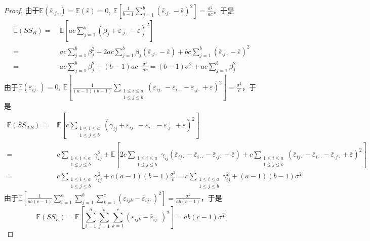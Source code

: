\documentclass[12pt, a4paper, oneside]{ctexart}
\let\leq=\leqslant %
\def\bd{\boldsymbol}        %
\def\E{\mathbb{E}}         %
\def\1{\bd{1}}
\begin{document}
\begin{proof}
    由于$\E(\bar{\varepsilon}_{\cdot j\cdot}) = \E(\bar{\varepsilon}) = 0,\ \E\left[\frac{1}{b-1}\sum_{j=1}^b(\bar{\varepsilon}_{\cdot j\cdot}-\bar{\varepsilon})^2\right] = \frac{\sigma^2}{ac}$，于是
    \begin{align*}
        \E(SS_B) =&\ \E\left[ac\sum_{j=1}^b(\beta_j+\bar{\varepsilon}_{\cdot j\cdot}-\bar{\varepsilon})^2\right]\\
        =&\ ac \sum_{j=1}^b\beta_j^2 + 2ac\sum_{j=1}^b\beta_j(\bar{\varepsilon}_{\cdot j\cdot}-\bar{\varepsilon})+bc\sum_{j=1}^b(\bar{\varepsilon}_{\cdot j\cdot}-\bar{\varepsilon})^2\\
        =&\ ac\sum_{j=1}^b\beta_j^2+(b-1)ac\cdot\frac{\sigma^2}{ac} = (b-1)\sigma^2+ac\sum_{j=1}^b\beta_j^2
    \end{align*}
    由于$\E(\bar{\varepsilon}_{ij\cdot}) = 0,\ \E\left[\frac{1}{(a-1)(b-1)}\sum_{\substack{1\leq i\leq a\\1\leq j\leq b}}(\bar{\varepsilon}_{ij\cdot}-\bar{\varepsilon}_{i\cdot\cdot}-\bar{\varepsilon}_{\cdot j\cdot}+\bar{\varepsilon})^2\right] = \frac{\sigma^2}{c}$，于是
    \begin{align*}
        \E(SS_{AB})=&\ \E\left[c\sum_{\substack{1\leq i\leq a\\1\leq j\leq b}}(\gamma_{ij}+\bar{\varepsilon}_{ij\cdot}-\bar{\varepsilon}_{i\cdot\cdot}-\bar{\varepsilon}_{\cdot j\cdot}+\bar{\varepsilon})^2\right]\\
        =&\ c\sum_{\substack{1\leq i\leq a\\1\leq j\leq b}}\gamma_{ij}^2+\E\left[2c\sum_{\substack{1\leq i\leq a\\1\leq j\leq b}}\gamma_{ij}(\bar{\varepsilon}_{ij\cdot}-\bar{\varepsilon}_{i\cdot\cdot}-\bar{\varepsilon}_{\cdot j\cdot}+\bar{\varepsilon})+c\sum_{\substack{1\leq i\leq a\\1\leq j\leq b}}(\bar{\varepsilon}_{ij\cdot}-\bar{\varepsilon}_{i\cdot\cdot}-\bar{\varepsilon}_{\cdot j\cdot}+\bar{\varepsilon})^2\right]\\
        =&\ c\sum_{\substack{1\leq i\leq a\\1\leq j\leq b}}\gamma_{ij}^2+c(a-1)(b-1)\frac{\sigma^2}{c}
        = c\sum_{\substack{1\leq i\leq a\\1\leq j\leq b}}\gamma_{ij}^2+(a-1)(b-1)\sigma^2
    \end{align*}
    由于$\E\left[\frac{1}{ab(c-1)}\sum_{i=1}^a\sum_{j=1}^b\sum_{k=1}^c(\varepsilon_{ijk}-\bar{\varepsilon}_{ij\cdot})^2\right] = \frac{\sigma^2}{ab(c-1)}$，于是
    \begin{equation*}
        \E(SS_E) = \E\left[\sum_{i=1}^a\sum_{j=1}^b\sum_{k=1}^c(\varepsilon_{ijk} - \bar{\varepsilon}_{ij\cdot})^2\right] = ab(c-1)\sigma^2.
    \end{equation*}
\end{proof}
\end{document}
